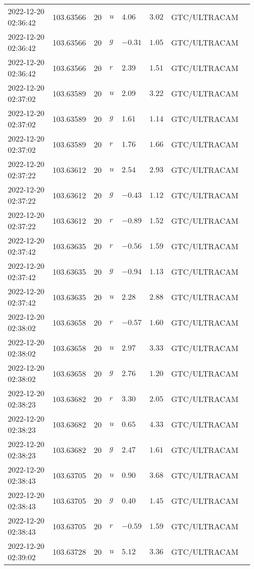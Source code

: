 \documentclass{nature_plusfigure}
\begin{document}
\begin{supplement}
\begin{center}
\begin{longtable}{llllllll}
2022-12-20 02:36:42 & 103.63566 & 20 & $u$ & $4.06$ & $3.02$ & GTC/ULTRACAM &  \\ 
2022-12-20 02:36:42 & 103.63566 & 20 & $g$ & $-0.31$ & $1.05$ & GTC/ULTRACAM &  \\ 
2022-12-20 02:36:42 & 103.63566 & 20 & $r$ & $2.39$ & $1.51$ & GTC/ULTRACAM &  \\ 
2022-12-20 02:37:02 & 103.63589 & 20 & $u$ & $2.09$ & $3.22$ & GTC/ULTRACAM &  \\ 
2022-12-20 02:37:02 & 103.63589 & 20 & $g$ & $1.61$ & $1.14$ & GTC/ULTRACAM &  \\ 
2022-12-20 02:37:02 & 103.63589 & 20 & $r$ & $1.76$ & $1.66$ & GTC/ULTRACAM &  \\ 
2022-12-20 02:37:22 & 103.63612 & 20 & $u$ & $2.54$ & $2.93$ & GTC/ULTRACAM &  \\ 
2022-12-20 02:37:22 & 103.63612 & 20 & $g$ & $-0.43$ & $1.12$ & GTC/ULTRACAM &  \\ 
2022-12-20 02:37:22 & 103.63612 & 20 & $r$ & $-0.89$ & $1.52$ & GTC/ULTRACAM &  \\ 
2022-12-20 02:37:42 & 103.63635 & 20 & $r$ & $-0.56$ & $1.59$ & GTC/ULTRACAM &  \\ 
2022-12-20 02:37:42 & 103.63635 & 20 & $g$ & $-0.94$ & $1.13$ & GTC/ULTRACAM &  \\ 
2022-12-20 02:37:42 & 103.63635 & 20 & $u$ & $2.28$ & $2.88$ & GTC/ULTRACAM &  \\ 
2022-12-20 02:38:02 & 103.63658 & 20 & $r$ & $-0.57$ & $1.60$ & GTC/ULTRACAM &  \\ 
2022-12-20 02:38:02 & 103.63658 & 20 & $u$ & $2.97$ & $3.33$ & GTC/ULTRACAM &  \\ 
2022-12-20 02:38:02 & 103.63658 & 20 & $g$ & $2.76$ & $1.20$ & GTC/ULTRACAM &  \\ 
2022-12-20 02:38:23 & 103.63682 & 20 & $r$ & $3.30$ & $2.05$ & GTC/ULTRACAM &  \\ 
2022-12-20 02:38:23 & 103.63682 & 20 & $u$ & $0.65$ & $4.33$ & GTC/ULTRACAM &  \\ 
2022-12-20 02:38:23 & 103.63682 & 20 & $g$ & $2.47$ & $1.61$ & GTC/ULTRACAM &  \\ 
2022-12-20 02:38:43 & 103.63705 & 20 & $u$ & $0.90$ & $3.68$ & GTC/ULTRACAM &  \\ 
2022-12-20 02:38:43 & 103.63705 & 20 & $g$ & $0.40$ & $1.45$ & GTC/ULTRACAM &  \\ 
2022-12-20 02:38:43 & 103.63705 & 20 & $r$ & $-0.59$ & $1.59$ & GTC/ULTRACAM &  \\ 
2022-12-20 02:39:02 & 103.63728 & 20 & $u$ & $5.12$ & $3.36$ & GTC/ULTRACAM &  \\ 

\end{longtable}
\end{center}
\end{supplement}
\end{document}
